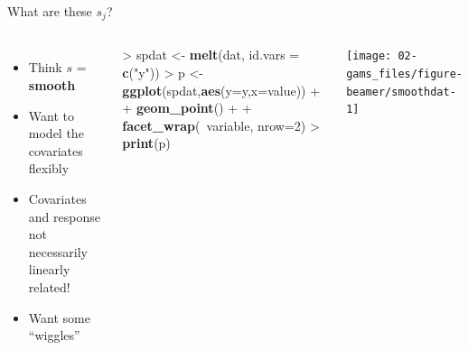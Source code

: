 \documentclass[10pt,ignorenonframetext,compress, aspectratio=169]{beamer}
\newenvironment{Shaded}{\begin{snugshade}}{\end{snugshade}}
\newcommand{\KeywordTok}[1]{\textcolor[rgb]{0.13,0.29,0.53}{\textbf{{#1}}}}
\newcommand{\DataTypeTok}[1]{\textcolor[rgb]{0.13,0.29,0.53}{{#1}}}
\newcommand{\DecValTok}[1]{\textcolor[rgb]{0.00,0.00,0.81}{{#1}}}
\newcommand{\StringTok}[1]{\textcolor[rgb]{0.31,0.60,0.02}{{#1}}}
\newcommand{\NormalTok}[1]{{#1}}
\providecommand{\tightlist}{%
  \setlength{\itemsep}{0pt}\setlength{\parskip}{0pt}}
\newcommand{\columnsbegin}{\begin{columns}}
\newcommand{\columnsend}{\end{columns}}
\begin{document}
\begin{frame}[fragile]{What are these \(s_j\)?}

\columnsbegin


\begin{itemize}
\tightlist
\item
  Think \(s\) = \textbf{smooth}
\item
  Want to model the covariates flexibly
\item
  Covariates and response not necessarily linearly related!
\item
  Want some ``wiggles''
\end{itemize}


\begin{Shaded}
\begin{Highlighting}[]
\NormalTok{>}\StringTok{ }\NormalTok{spdat <-}\StringTok{ }\KeywordTok{melt}\NormalTok{(dat, }\DataTypeTok{id.vars =} \KeywordTok{c}\NormalTok{(}\StringTok{"y"}\NormalTok{))}
\NormalTok{>}\StringTok{ }\NormalTok{p <-}\StringTok{ }\KeywordTok{ggplot}\NormalTok{(spdat,}\KeywordTok{aes}\NormalTok{(}\DataTypeTok{y=}\NormalTok{y,}\DataTypeTok{x=}\NormalTok{value)) +}
\NormalTok{+}\StringTok{       }\KeywordTok{geom_point}\NormalTok{() +}
\NormalTok{+}\StringTok{       }\KeywordTok{facet_wrap}\NormalTok{(~variable, }\DataTypeTok{nrow=}\DecValTok{2}\NormalTok{)}
\NormalTok{>}\StringTok{ }\KeywordTok{print}\NormalTok{(p)}
\end{Highlighting}
\end{Shaded}

\begin{center}\texttt{[image: 02-gams\_files/figure-beamer/smoothdat-1]} \end{center}

\columnsend

\end{frame}
\end{document}
